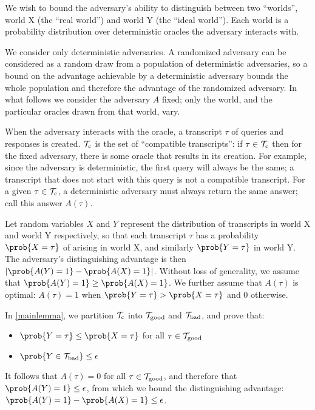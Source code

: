 \documentclass[hctr2.tex]{subfiles}
\begin{document}
We wish to bound the adversary's ability to distinguish between
two ``worlds'', world X (the ``real world'') and world Y (the ``ideal world'').
Each world is a probability distribution over
deterministic oracles the adversary interacts with.

We consider only deterministic adversaries.
A randomized adversary can be considered as a random draw
from a population of deterministic adversaries, so
a bound on the advantage achievable by a deterministic
adversary bounds the whole population and therefore
the advantage of the randomized adversary. In what follows
we consider the adversary \(A\) fixed; only the world, and the
particular oracles drawn from that world, vary.

When the adversary interacts with the oracle,
a transcript \(\tau\) of queries and responses is created.
\(\mathcal{T}_\mathrm{c}\) is the set of ``compatible transcripts'':
if \(\tau \in \mathcal{T}_\mathrm{c}\) then for the fixed adversary,
there is some oracle
that results in its creation. For example,
since the adversary is deterministic, the first query
will always be the same; a transcript that
does not start with this query is not a compatible transcript.
For a given \(\tau \in \mathcal{T}_\mathrm{c}\),
a deterministic adversary must always
return the same answer; call this answer \(A(\tau)\).

Let random variables \(X\) and \(Y\)
represent the distribution of transcripts
in world X and world Y respectively, so that
each transcript \(\tau\) has a probability \(\prob{X = \tau}\)
of arising in world X, and similarly \(\prob{Y = \tau}\) in world Y\@.
The adversary's distinguishing advantage is then
\(\left|\prob{A(Y) = 1} - \prob{A(X) = 1}\right|\).
Without loss of generality,
we assume that \(\prob{A(Y) = 1} \geq \prob{A(X) = 1}\).
We further assume that \(A(\tau)\) is optimal:
\(A(\tau) = 1\)
when \(\prob{Y = \tau} > \prob{X = \tau}\) and 0 otherwise.

In \autoref{mainlemma}, we partition \(\mathcal{T}_\mathrm{c}\) into \(\mathcal{T}_\mathrm{good}\) and \(\mathcal{T}_\mathrm{bad}\),
and prove that:
\begin{itemize}
    \item \(\prob{Y = \tau} \leq \prob{X = \tau}\) for all \(\tau \in \mathcal{T}_\mathrm{good}\)
    \item \(\prob{Y \in \Tb} \leq \epsilon\)
\end{itemize}
It follows that \(A(\tau) = 0\) for all \(\tau \in \mathcal{T}_\mathrm{good}\),
and therefore that \(\prob{A(Y) = 1} \leq \epsilon\),
from which we bound the distinguishing advantage:
\(\prob{A(Y) = 1} - \prob{A(X) = 1} \leq \epsilon\).
\end{document}
